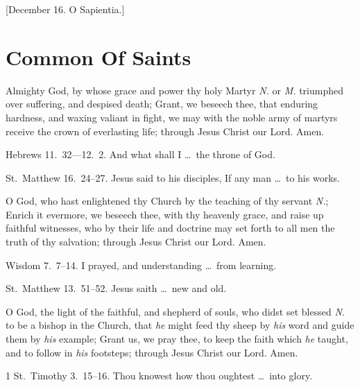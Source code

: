 \medskip

[December 16. O Sapientia.]


 

\section{Common Of Saints}


 Almighty God, by whose grace and power thy holy Martyr \emph{N.} or \emph{M.} triumphed over suffering, and despised death; Grant, we beseech thee, that enduring hardness, and waxing valiant in fight, we may with the noble army of martyrs receive the crown of everlasting life; through Jesus Christ our Lord. \R Amen.

 Hebrews 11.~32—12.~2.   And what shall I \ldots\ the throne of God.

 St.~Matthew 16.~24–27.   Jesus said to his disciples, If any man \ldots\ to his works.

\medskip


 O God, who hast enlightened thy Church by the teaching of thy servant \emph{N.}; Enrich it evermore, we beseech thee, with thy heavenly grace, and raise up faithful witnesses, who by their life and doctrine may set forth to all men the truth of thy salvation; through Jesus Christ our Lord. \R Amen.

 Wisdom 7.~7–14.   I prayed, and understanding \ldots\ from learning.

 St.~Matthew 13.~51–52.   Jesus saith \ldots\ new and old.

\medskip


 O God, the light of the faithful, and shepherd of souls, who didst set blessed \emph{N.} to be a bishop in the Church, that \emph{he} might feed thy sheep by \emph{his} word and guide them by \emph{his} example; Grant us, we pray thee, to keep the faith which \emph{he} taught, and to follow in \emph{his} footsteps; through Jesus Christ our Lord. \R Amen.

 1 St.~Timothy 3.~15–16.   Thou knowest how thou oughtest \ldots\ into glory.


